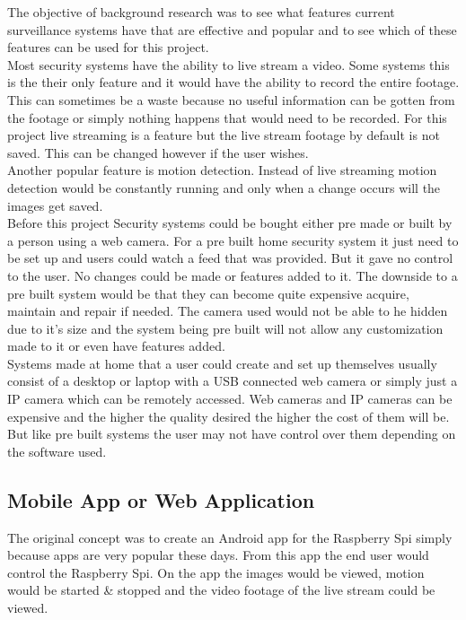 \documentclass[]{report}
\begin{document}
The objective of background research was to see what features current surveillance systems have that are effective and popular and to see which of these features can be used for this project.\\

Most security systems have the ability to live stream a video. Some systems this is the their only feature and it would have the ability to record the entire footage. This can sometimes be a waste because no useful information can be gotten from the footage or simply nothing happens that would need to be recorded. For this project live streaming is a feature but the live stream footage by default is not saved. This can be changed however if the user wishes.\\
Another popular feature is motion detection. Instead of live streaming motion detection would be constantly running and only when a change occurs will the images get saved. \\

Before this project Security systems could be bought either pre made or built by a person using a web camera. For a pre built home security system it just need to be set up and users could watch a feed that was provided. But it gave no control to the user. No changes could be made or features added to it. The downside to a pre built system would be that they can become quite expensive acquire, maintain and repair if needed. The camera used would not be able to he hidden due to it’s size and the system being pre built will not allow any customization made to it or even have features added.\\

Systems made at home that a user could create and set up themselves usually consist of a desktop or laptop with a USB connected web camera or simply just a IP camera which can be remotely accessed. Web cameras and IP cameras can be expensive and the higher the quality desired the higher the cost of them will be.  But like pre built systems the user may not have control over them depending on the software used. \\ 

\subsection{Mobile App or Web Application}
\label{subsec:Android}
The original concept was to create an Android app for the Raspberry Spi simply because apps are very popular these days. From this app the end user would control the Raspberry Spi. On the app the images would be viewed, motion would be started \& stopped and the video footage of the live stream could be viewed. \\
\end{document}
